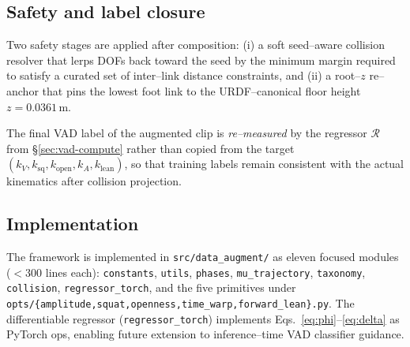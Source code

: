 \subsection{Safety and label closure}

Two safety stages are applied after composition:
(i) a soft seed--aware collision resolver that lerps DOFs back toward the
seed by the minimum margin required to satisfy a curated set of
inter--link distance constraints, and
(ii) a root--$z$ re--anchor that pins the lowest foot link to the
URDF--canonical floor height $z\!=\!0.0361\,$m.

The final VAD label of the augmented clip is \emph{re--measured} by the
regressor $\mathcal{R}$ from \S\ref{sec:vad-compute} rather than copied
from the target $(k_V,k_{\text{sq}},k_{\text{open}},k_A,k_{\text{lean}})$,
so that training labels remain consistent with the actual kinematics
after collision projection.

\subsection{Implementation}

The framework is implemented in \texttt{src/data\_augment/} as eleven
focused modules ($<300$ lines each):
\texttt{constants}, \texttt{utils}, \texttt{phases},
\texttt{mu\_trajectory}, \texttt{taxonomy}, \texttt{collision},
\texttt{regressor\_torch}, and the five primitives under
\texttt{opts/\{amplitude,squat,openness,time\_warp,forward\_lean\}.py}.
The differentiable regressor (\texttt{regressor\_torch}) implements
Eqs.~\eqref{eq:phi}--\eqref{eq:delta} as PyTorch ops, enabling future
extension to inference--time VAD classifier guidance.

\endinput
